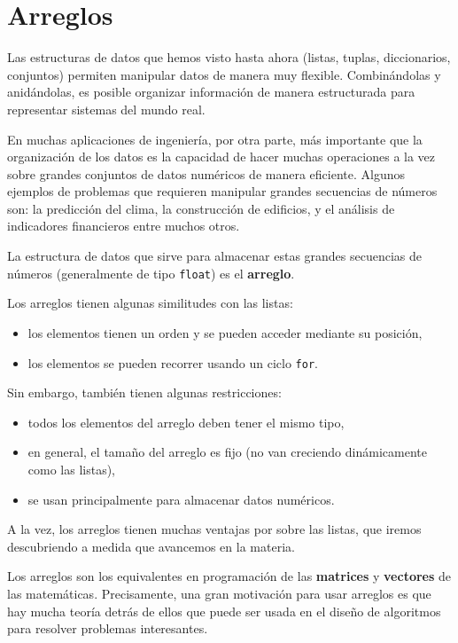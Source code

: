 \chapter{Arreglos}

Las estructuras de datos que hemos visto hasta ahora (listas, tuplas,
diccionarios, conjuntos) permiten manipular datos de manera muy
flexible. Combinándolas y anidándolas, es posible organizar información
de manera estructurada para representar sistemas del mundo real.

En muchas aplicaciones de ingeniería, por otra parte, más importante que
la organización de los datos es la capacidad de hacer muchas operaciones
a la vez sobre grandes conjuntos de datos numéricos de manera eficiente.
Algunos ejemplos de problemas que requieren manipular grandes secuencias
de números son: la predicción del clima, la construcción de edificios, y
el análisis de indicadores financieros entre muchos otros.

La estructura de datos que sirve para almacenar estas grandes secuencias
de números (generalmente de tipo \lstinline!float!) es el
\textbf{arreglo}.

Los arreglos tienen algunas similitudes con las listas:
\begin{itemize}
\item
  los elementos tienen un orden y se pueden acceder mediante su
  posición,
\item
  los elementos se pueden recorrer usando un ciclo \lstinline!for!.
\end{itemize}
Sin embargo, también tienen algunas restricciones:
\begin{itemize}
\item
  todos los elementos del arreglo deben tener el mismo tipo,
\item
  en general, el tamaño del arreglo es fijo (no van creciendo
  dinámicamente como las listas),
\item
  se usan principalmente para almacenar datos numéricos.
\end{itemize}

A la vez, los arreglos tienen muchas ventajas por sobre las listas, que
iremos descubriendo a medida que avancemos en la materia.

Los arreglos son los equivalentes en programación de las
\textbf{matrices} y \textbf{vectores} de las matemáticas. Precisamente,
una gran motivación para usar arreglos es que hay mucha teoría detrás de
ellos que puede ser usada en el diseño de algoritmos para resolver
problemas interesantes.

